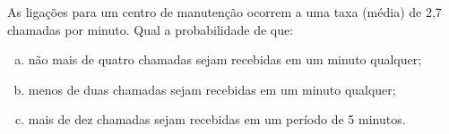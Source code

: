%
%


\begin{exercicioBanco}[\valorquestao]
As ligações para um centro de manutenção ocorrem a uma taxa (média) de 2,7 chamadas por
minuto. Qual a probabilidade de que:
%
\begin{enumerate}[(a)]
    \item não mais de quatro chamadas sejam recebidas em um minuto qualquer;
    \item menos de duas chamadas sejam recebidas em um minuto qualquer;
    \item mais de dez chamadas sejam recebidas em um período de 5 minutos.
\end{enumerate}
%
\end{exercicioBanco}

